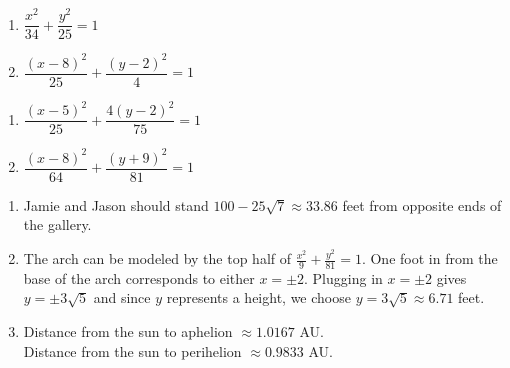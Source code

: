 \begin{multicols}{2}
\begin{enumerate}
\setcounter{enumi}{\value{HW}}

\item $\dfrac{x^{2}}{34} + \dfrac{y^{2}}{25} = 1$
\item $\dfrac{(x - 8)^{2}}{25} + \dfrac{(y - 2)^{2}}{4} = 1$

\setcounter{HW}{\value{enumi}}
\end{enumerate}
\end{multicols}

\begin{multicols}{2}
\begin{enumerate}
\setcounter{enumi}{\value{HW}}

\item $\dfrac{(x-5)^{2}}{25} + \dfrac{4(y-2)^{2}}{75} = 1$
\item $\dfrac{(x - 8)^{2}}{64} + \dfrac{(y + 9)^{2}}{81} = 1$

\setcounter{HW}{\value{enumi}}
\end{enumerate}
\end{multicols}

\begin{enumerate}
\setcounter{enumi}{\value{HW}}

\item  Jamie and Jason should stand $100-25\sqrt{7} \approx 33.86$ feet from opposite ends of the gallery.

\item  The arch can be modeled by the top half of $\frac{x^2}{9} + \frac{y^2}{81} = 1$.  One foot in from the base of the arch corresponds to either $x = \pm 2$.  Plugging in $x = \pm 2$ gives $y = \pm 3\sqrt{5}$ and since $y$ represents a height, we choose $y=3\sqrt{5} \approx 6.71$ feet. 

\item Distance from the sun to aphelion $\approx 1.0167$ AU.\\
Distance from the sun to perihelion $\approx 0.9833$ AU.

\end{enumerate}

\closegraphsfile